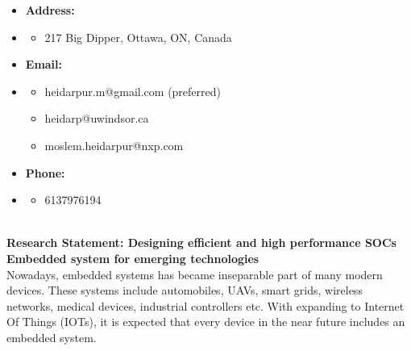 \documentclass[12pt,oneside]{book}
\begin{document}
\begin {itemize}
\begin {itemize}
\end {itemize}   \vspace{0.5em}
\item  [] {\bf  Address:} \vspace{-1.5em}
\item []  {\bf \hrulefill } \vspace{-1em}
\begin {itemize} 
\item  \small 217 Big Dipper, Ottawa, ON, Canada
\end{itemize}  \vspace{0.5em}
\item  []  {\bf  Email:} \vspace{-1.5em}
\item []  {\bf \hrulefill } \vspace{-1em}
\begin {itemize} 
 \item  \small heidarpur.m@gmail.com (preferred)
 \item \small heidarp@uwindsor.ca
 \item \small moslem.heidarpur@nxp.com
\end {itemize}   \vspace{0.5em}
\item  []   {\bf Phone:} \vspace{-1.5em}
\item []  {\bf \hrulefill } \vspace{-1em}
\begin {itemize} 
\item 6137976194
\end{itemize}
\end{itemize}

\newpage
 
\newpage

\newpage

\newpage

\newpage


\newpage
%


%
%
\newpage



%


 \newpage
 \thispagestyle{empty}
 \small
{}
 \phantom \quad \\
{\bf Research Statement: 
Designing efficient and high performance SOCs  Embedded system for emerging technologies
}
\vspace*{2\baselineskip}\\
Nowadays, embedded systems has became inseparable part of many modern devices. These systems include automobiles, UAVs, smart grids, wireless networks, medical devices, industrial controllers etc. With expanding to Internet Of Things (IOTs), it is expected that every device in the near future includes an embedded system. 
\end{document}
